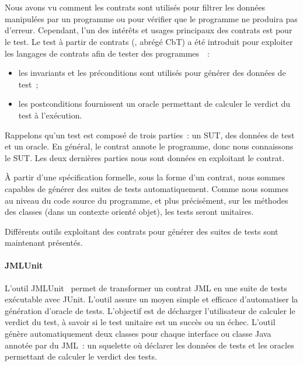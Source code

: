\section{}
\label{section:sota:cbt}

Nous avons vu comment les contrats sont utilisés pour {\strong filtrer} les
données manipulées par un programme ou pour vérifier que le programme ne
produira pas d'erreur. Cependant, l'un des intérêts et usages principaux des
contrats est pour le {\strong test}. Le {\strong test à partir de contrats}
(, abrégé CbT) a été introduit pour exploiter
les langages de contrats afin de tester des programmes~~:

\begin{itemize}

\item les invariants et les préconditions sont utilisés pour {\strong générer
des données} de test~;

\item les postconditions {\strong fournissent un oracle} permettant de calculer
le verdict du test à l'exécution.

\end{itemize}
%
Rappelons qu'un test est composé de trois parties~: un SUT, des données de test
et un oracle. En général, le contrat annote le programme, donc nous connaissons
le SUT. Les deux dernières parties nous sont données en exploitant le contrat.

À partir d'une spécification formelle, sous la forme d'un contrat, nous sommes
capables de générer des suites de tests automatiquement. Comme nous sommes au
niveau du code source du programme, et plus précisément, sur les méthodes des
classes (dans un contexte orienté objet), les tests seront {\strong unitaires}.

Différents outils exploitant des contrats pour générer des suites de tests sont
maintenant présentés.

\paragraph{JMLUnit} L'outil JMLUnit~ permet de
transformer un contrat JML en une suite de tests exécutable avec JUnit. L'outil
assure un moyen simple et efficace d'automatiser la génération d'oracle de
tests. L'objectif est de décharger l'utilisateur de calculer le verdict du
test, à savoir si le test unitaire est un succès ou un échec. L'outil génère
automatiquement deux classes pour chaque interface ou classe Java annotée par
du JML~: un squelette où déclarer les données de tests et les oracles permettant
de calculer le verdict des tests.

